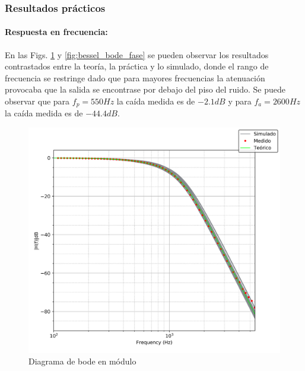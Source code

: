 \subsubsection{Resultados pr\'acticos}

\paragraph{Respuesta en frecuencia:} En las Figs. \ref{fig:bessel_bode_modulo} y \ref{fig:bessel_bode_fase} se pueden observar los resultados
contrastados entre la teor\'ia, la pr\'actica y lo simulado, donde el rango de frecuencia se restringe dado que para mayores frecuencias la atenuaci\'on
provocaba que la salida se encontrase por debajo del piso del ruido. Se puede observar que para $f_p = 550Hz$ la ca\'ida medida es de $-2.1dB$ y para $f_a = 2600Hz$ la ca\'ida
medida es de $-44.4dB$.

\begin{figure}[H]
    \centering
    \includegraphics[scale=0.7]{../EJ1/Recursos/bessel_bode_modula.png}
    \caption{Diagrama de bode en m\'odulo}
    \label{fig:bessel_bode_modulo}
\end{figure}

